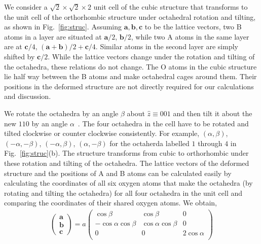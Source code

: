\documentclass[a4paper,prb,twocolumn]{revtex4-1}  %
\newcommand{\az}[1]{{\color{magenta}{#1}}} %
\begin{document}
We consider a
$\sqrt{2}\times\sqrt{2}\times 2$ unit cell of the cubic structure that transforms
to the unit cell of the orthorhombic structure under octahedral rotation and tilting,
as shown in Fig.~\ref{fig:struc}.
Assuming 
$\textbf{a},\textbf{b},\textbf{c}$
 to be the lattice vectors,
two B atoms in a layer are situated at
$\textbf{a}/2$, $\textbf{b}/2$,
while two A atoms in the same layer are at
$\textbf{c}/4$, $(\textbf{a}+\textbf{b})/2 + \textbf{c}/4$.
Similar atoms in the second layer are simply shifted by 
$\textbf{c} /2$.
While the lattice vectors change under the rotation and tilting of the octahedra, 
these relations do not change.
The O atoms in the cubic structure lie half way between the B atoms and make octahedral cages around them.
Their positions in the deformed structure %
are not directly required for our calculations and discussion.


We rotate the octahedra by an angle $\beta$ about $\hat z \equiv 001$
and then tilt it about the new $110$ by an angle $\alpha$~\cite{CarterPRB12}.
The four octahedra in the cell 
have to be rotated and tilted clockwise or counter clockwise
consistently. For example, %
$(\alpha,\beta)$,
$(-\alpha,-\beta)$,
$(-\alpha,\beta)$,
$(\alpha,-\beta)$
for the octaherda labelled $1$ through $4$ in Fig.~\ref{fig:struc}(b).
The structure transforms from cubic to orthorhombic under these rotation and tilting of the octahedra.
The lattice vectors of the deformed structure and the positions of A and B atoms can be calculated easily by calculating the coordinates of all six oxygen atoms that make the octahedra (by rotating and tilting the octahedra) for all four octahedra in the unit cell and 
comparing the coordinates of their shared oxygen atoms.
We obtain,
\begin{align}
\left(
\begin{array}{c}
\textbf{a}\\
\textbf{b}\\
\textbf{c}
\end{array}
\right)
= a
\left(
\begin{array}{ccc}
 \cos \beta  & \cos \beta  & 0 \\
 -\cos \alpha  \cos \beta  & \cos \alpha  \cos \beta  & 0 \\
 0 & 0 & 2 \cos \alpha  \\
\end{array}
\right)
\end{align}
\end{document}
